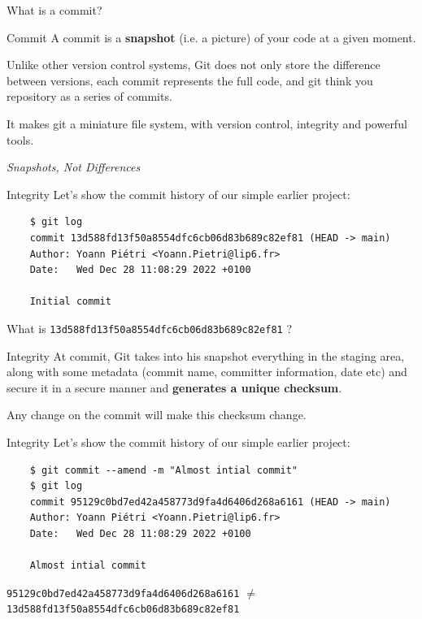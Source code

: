 \documentclass[10pt,aspectratio=169]{beamer}
\begin{document}
{
\begin{frame}
    What is a commit?
\end{frame}
}

\begin{frame}[fragile]{Commit}
    A commit is a \textbf{snapshot} (i.e. a picture) of your code at a given moment.

    Unlike other version control systems, Git does not only store the difference between versions, each commit represents the full code, and git think you repository as a series of commits.

    It makes git a miniature file system, with version control, integrity and powerful tools.

    \textit{Snapshots, Not Differences}
\end{frame}

\begin{frame}[fragile]{Integrity}
    Let's show the commit history of our simple earlier project:
    \begin{verbatim}
    $ git log
    commit 13d588fd13f50a8554dfc6cb06d83b689c82ef81 (HEAD -> main)
    Author: Yoann Piétri <Yoann.Pietri@lip6.fr>
    Date:   Wed Dec 28 11:08:29 2022 +0100

    Initial commit
    \end{verbatim}

    What is \verb|13d588fd13f50a8554dfc6cb06d83b689c82ef81| ?
\end{frame}

\begin{frame}[fragile]{Integrity}
    At commit, Git takes into his snapshot everything in the staging area, along with some metadata (commit name, committer information, date etc) and secure it in a secure manner and \textbf{generates a unique checksum}.

    Any change on the commit will make this checksum change.
\end{frame}


\begin{frame}[fragile]{Integrity}
    Let's show the commit history of our simple earlier project:
    \begin{verbatim}
    $ git commit --amend -m "Almost intial commit"
    $ git log
    commit 95129c0bd7ed42a458773d9fa4d6406d268a6161 (HEAD -> main)
    Author: Yoann Piétri <Yoann.Pietri@lip6.fr>
    Date:   Wed Dec 28 11:08:29 2022 +0100

    Almost intial commit
    \end{verbatim}

    \verb|95129c0bd7ed42a458773d9fa4d6406d268a6161| $\neq$ \verb|13d588fd13f50a8554dfc6cb06d83b689c82ef81|
\end{frame}
\end{document}
